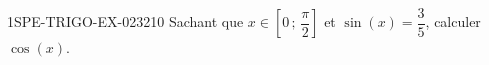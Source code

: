 \begin{exercice}{1SPE-TRIGO-EX-023}{2}{10}
Sachant que $x \in \left[0 \,;\, \dfrac{\pi}{2}\right]$ et $\sin(x) = \dfrac{3}{5}$, calculer $\cos(x)$.
\end{exercice}

%
